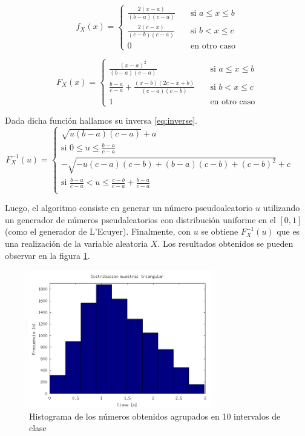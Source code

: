 \documentclass{sig-alternate}
\begin{document}
\begin{equation}
\label{eq:triangle}
f_{X}(x) =
\begin{cases}
\frac{2(x-a)}{(b-a)(c-a)} \quad & \text{si } a \leq x \leq b \\
\frac{2(c-x)}{(c-b)(c-a)} \quad & \text{si } b < x \leq c \\
0 \quad & \text{en otro caso}
\end{cases}
\end{equation}

\begin{equation}
\label{eq:triangleDistribution}
F_{X}(x) =
\begin{cases}
\frac{(x-a)^{2}}{(b-a)(c-a)} \quad & \text{si } a \leq x \leq b \\
\frac{b-a}{c-a} + \frac{(x-b)(2c-x+b)}{(c-a)(c-b)} \quad & \text{si } b < x \leq c \\
1 \quad & \text{en otro caso}
\end{cases}
\end{equation}

Dada dicha funci\'on hallamos su inversa \eqref{eq:inverse}.\\

\begin{equation}
\label{eq:inverse}
F^{-1}_{X}(u) =
\begin{cases}
\sqrt{u(b-a)(c-a)}+a \quad & \\
\text{si } 0 \leq u \leq \frac{b-a}{c-a} & \\
-\sqrt{-u(c-a)(c-b)+(b-a)(c-b)+(c-b)^{2}} + c \quad & \\
\text{si } \frac{b-a}{c-a} < u \leq \frac{c-b}{c-a}+\frac{b-a}{c-a} \\
\end{cases}
\end{equation}

Luego, el algoritmo consiste en generar un n\'umero pseudoaleatorio $u$ utilizando
un generador de n\'umeros pseudaleatorios con distribuci\'on uniforme en el $[0,1]$ (como el generador de L'Ecuyer).
Finalmente, con $u$ se obtiene $F^{-1}_{X}(u)$ que es una realizaci\'on de la variable aleatoria $X$.
Los resultados obtenidos se pueden observar en la figura \ref{fig:triangle}.

\begin{figure}[ht]
\label{fig:triangle}
\includegraphics[width=8cm]{histograma_triangular}
\caption{Histograma de los n\'umeros obtenidos agrupados en 10 intervalos de clase}
\end{figure}
\end{document}
